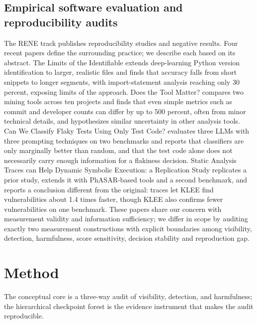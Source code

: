 \documentclass[10pt,conference]{IEEEtran}
\begin{document}
\subsection{Empirical software evaluation and reproducibility audits}
The RENE track publishes reproducibility studies and negative results. Four recent papers define the surrounding practice; we describe each based on its abstract. The Limits of the Identifiable \cite{gerhold2024limits} extends deep-learning Python version identification to larger, realistic files and finds that accuracy falls from short snippets to longer segments, with import-statement analysis reaching only 30 percent, exposing limits of the approach. Does the Tool Matter? \cite{hoess2025does} compares two mining tools across ten projects and finds that even simple metrics such as commit and developer counts can differ by up to 500 percent, often from minor technical details, and hypothesizes similar uncertainty in other analysis tools. Can We Classify Flaky Tests Using Only Test Code? \cite{berndt2026flaky} evaluates three LLMs with three prompting techniques on two benchmarks and reports that classifiers are only marginally better than random, and that the test code alone does not necessarily carry enough information for a flakiness decision. Static Analysis Traces can Help Dynamic Symbolic Execution: a Replication Study \cite{kummita2026static} replicates a prior study, extends it with PhASAR-based tools and a second benchmark, and reports a conclusion different from the original: traces let KLEE find vulnerabilities about 1.4 times faster, though KLEE also confirms fewer vulnerabilities on one benchmark. These papers share our concern with measurement validity and information sufficiency; we differ in scope by auditing exactly two measurement constructions with explicit boundaries among visibility, detection, harmfulness, score sensitivity, decision stability and reproduction gap.
\section{Method}
The conceptual core is a three-way audit of visibility, detection, and harmfulness; the hierarchical checkpoint forest is the evidence instrument that makes the audit reproducible.
\end{document}
